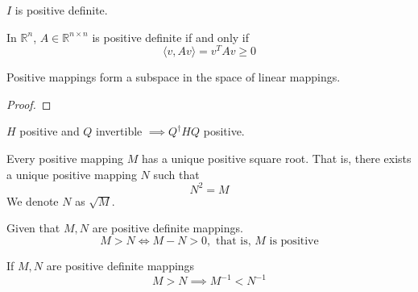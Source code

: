 	\begin{example}
	  \label{ex:positive-definite-maps}
	  $I$ is positive definite. 
	\end{example}

	\begin{example}
	  \label{ex:positive-definite-matrices}
		In $\mathbb{R}^n$, $A \in \mathbb{R}^{n \times n}$ is positive definite if and only if 
    \begin{equation}
      \langle v, A v \rangle = v^T A v \geq 0 
    \end{equation}
  \end{example}

	\begin{theorem}
	  \label{thm:subspace-of-positive-definite-maps}
		Positive mappings form a subspace in the space of linear mappings. 
	\end{theorem}
	\begin{proof}
	  
	\end{proof}

	\begin{theorem}
	  \label{thm:congruence-preserves-positivity}
		$H$ positive and $Q$ invertible $\implies Q^\dagger H Q$ positive. 
	\end{theorem}

  \begin{theorem}
    \label{thm:unique-positive-square-root}
    Every positive mapping $M$ has a unique positive square root. That is, there exists a unique positive mapping $N$ such that
    \begin{equation}
      N^2 = M 
    \end{equation}
    We denote $N$ as $\sqrt{M}$. 
  \end{theorem}

  \begin{definition}
    \label{def:loewner-order-on-positive-definite-mappings}
    Given that $M, N$ are positive definite mappings. 
    \begin{equation}
      M > N \iff M - N > 0, \text{ that is, $M$ is positive}
    \end{equation}
  \end{definition}

  \begin{theorem}
    \label{thm:order-reversal-under-inversion}
    If $M, N$ are positive definite mappings 
    \begin{equation}
       M > N \implies M^{-1} < N^{-1}
    \end{equation}
  \end{theorem}


